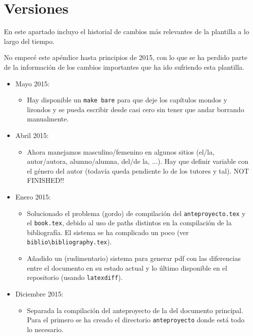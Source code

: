 
\chapter{Versiones}
\label{cha:versiones}

En este apartado incluyo el historial de cambios más relevantes de la
plantilla a lo largo del tiempo.

No empecé este apéndice hasta principios de 2015, con lo que se ha
perdido parte de la información de los cambios importantes que ha ido
sufriendo esta plantilla.


\begin{itemize}

\item Mayo 2015:
  \begin{itemize}
  \item Hay disponible un \texttt{make bare} para que deje los capítulos
    mondos y lirondos y se pueda escribir desde casi cero sin tener que
    andar borrando manualmente.
  \end{itemize}


\item Abril 2015:
  \begin{itemize}
  \item Ahora manejamos masculino/femenino en algunos sitios (el/la,
    autor/autora, alumno/alumna, del/de la, ...). Hay que definir
    variable con el género del autor (todavía queda pendiente lo de los
    tutores y tal). NOT FINISHED!!
  \end{itemize}


\item Enero 2015:
  \begin{itemize}
  \item Solucionado el problema (gordo) de compilación del
    \texttt{anteproyecto.tex} y el \texttt{book.tex}, debido al uso de
    paths distintos en la compilación de la bibliografía. El sistema se ha
    complicado un poco (ver
    \texttt{biblio\textbackslash{}bibliography.tex}).
  \item Añadido un (rudimentario) sistema para generar pdf con las
    diferencias entre el documento en su estado actual y lo último
    disponible en el repositorio (usando \texttt{latexdiff}).
  \end{itemize}
\item Diciembre 2015:
  \begin{itemize}
  \item Separada la compilación del anteproyecto de la del documento
    principal. Para el primero se ha creado el directorio
    \texttt{anteproyecto} donde está todo lo necesario.
  \end{itemize}
\end{itemize}



